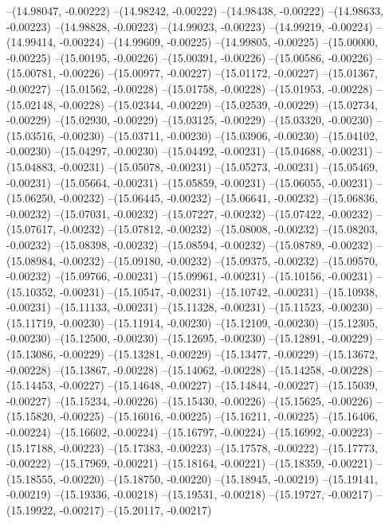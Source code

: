 --(14.98047, -0.00222)
--(14.98242, -0.00222)
--(14.98438, -0.00222)
--(14.98633, -0.00223)
--(14.98828, -0.00223)
--(14.99023, -0.00223)
--(14.99219, -0.00224)
--(14.99414, -0.00224)
--(14.99609, -0.00225)
--(14.99805, -0.00225)
--(15.00000, -0.00225)
--(15.00195, -0.00226)
--(15.00391, -0.00226)
--(15.00586, -0.00226)
--(15.00781, -0.00226)
--(15.00977, -0.00227)
--(15.01172, -0.00227)
--(15.01367, -0.00227)
--(15.01562, -0.00228)
--(15.01758, -0.00228)
--(15.01953, -0.00228)
--(15.02148, -0.00228)
--(15.02344, -0.00229)
--(15.02539, -0.00229)
--(15.02734, -0.00229)
--(15.02930, -0.00229)
--(15.03125, -0.00229)
--(15.03320, -0.00230)
--(15.03516, -0.00230)
--(15.03711, -0.00230)
--(15.03906, -0.00230)
--(15.04102, -0.00230)
--(15.04297, -0.00230)
--(15.04492, -0.00231)
--(15.04688, -0.00231)
--(15.04883, -0.00231)
--(15.05078, -0.00231)
--(15.05273, -0.00231)
--(15.05469, -0.00231)
--(15.05664, -0.00231)
--(15.05859, -0.00231)
--(15.06055, -0.00231)
--(15.06250, -0.00232)
--(15.06445, -0.00232)
--(15.06641, -0.00232)
--(15.06836, -0.00232)
--(15.07031, -0.00232)
--(15.07227, -0.00232)
--(15.07422, -0.00232)
--(15.07617, -0.00232)
--(15.07812, -0.00232)
--(15.08008, -0.00232)
--(15.08203, -0.00232)
--(15.08398, -0.00232)
--(15.08594, -0.00232)
--(15.08789, -0.00232)
--(15.08984, -0.00232)
--(15.09180, -0.00232)
--(15.09375, -0.00232)
--(15.09570, -0.00232)
--(15.09766, -0.00231)
--(15.09961, -0.00231)
--(15.10156, -0.00231)
--(15.10352, -0.00231)
--(15.10547, -0.00231)
--(15.10742, -0.00231)
--(15.10938, -0.00231)
--(15.11133, -0.00231)
--(15.11328, -0.00231)
--(15.11523, -0.00230)
--(15.11719, -0.00230)
--(15.11914, -0.00230)
--(15.12109, -0.00230)
--(15.12305, -0.00230)
--(15.12500, -0.00230)
--(15.12695, -0.00230)
--(15.12891, -0.00229)
--(15.13086, -0.00229)
--(15.13281, -0.00229)
--(15.13477, -0.00229)
--(15.13672, -0.00228)
--(15.13867, -0.00228)
--(15.14062, -0.00228)
--(15.14258, -0.00228)
--(15.14453, -0.00227)
--(15.14648, -0.00227)
--(15.14844, -0.00227)
--(15.15039, -0.00227)
--(15.15234, -0.00226)
--(15.15430, -0.00226)
--(15.15625, -0.00226)
--(15.15820, -0.00225)
--(15.16016, -0.00225)
--(15.16211, -0.00225)
--(15.16406, -0.00224)
--(15.16602, -0.00224)
--(15.16797, -0.00224)
--(15.16992, -0.00223)
--(15.17188, -0.00223)
--(15.17383, -0.00223)
--(15.17578, -0.00222)
--(15.17773, -0.00222)
--(15.17969, -0.00221)
--(15.18164, -0.00221)
--(15.18359, -0.00221)
--(15.18555, -0.00220)
--(15.18750, -0.00220)
--(15.18945, -0.00219)
--(15.19141, -0.00219)
--(15.19336, -0.00218)
--(15.19531, -0.00218)
--(15.19727, -0.00217)
--(15.19922, -0.00217)
--(15.20117, -0.00217)
